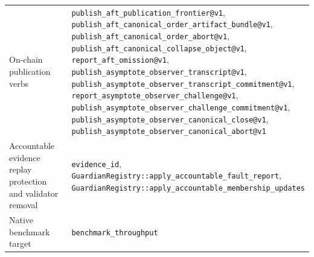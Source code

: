 \documentclass[11pt]{article}
\newcommand{\code}[1]{\texttt{#1}}
\begin{document}
\begin{center}
\begin{tabularx}{\textwidth}{>{\raggedright\arraybackslash}p{} X}
On-chain publication verbs & \shortstack[l]{\code{publish\_aft\_publication\_frontier@v1},\\\code{publish\_aft\_canonical\_order\_artifact\_bundle@v1},\\\code{publish\_aft\_canonical\_order\_abort@v1},\\\code{publish\_aft\_canonical\_collapse\_object@v1},\\\code{report\_aft\_omission@v1},\\\code{publish\_asymptote\_observer\_transcript@v1},\\\code{publish\_asymptote\_observer\_transcript\_commitment@v1},\\\code{report\_asymptote\_observer\_challenge@v1},\\\code{publish\_asymptote\_observer\_challenge\_commitment@v1},\\\code{publish\_asymptote\_observer\_canonical\_close@v1},\\\code{publish\_asymptote\_observer\_canonical\_abort@v1}} \\
Accountable evidence replay protection and validator removal & \shortstack[l]{\code{evidence\_id},\\\code{GuardianRegistry::apply\_accountable\_fault\_report},\\\code{GuardianRegistry::apply\_accountable\_membership\_updates}} \\
Native benchmark target & \code{benchmark\_throughput} \\
\bottomrule
\end{tabularx}
\end{center}
\end{document}
